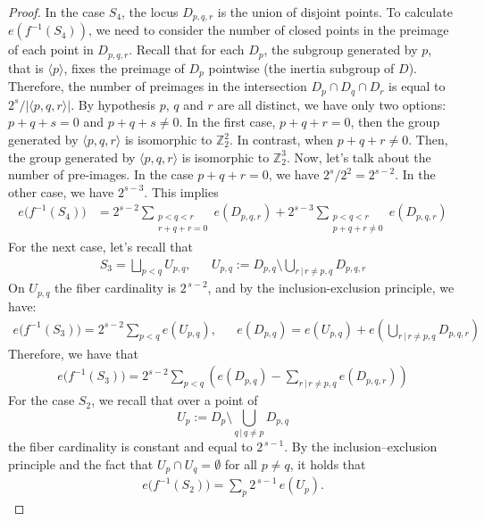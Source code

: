\documentclass[12pt,twoside,]{amsart}
\theoremstyle{plain}
\theoremstyle{definition}
\newcommand{\Z}{\mathbb Z}
\begin{document}
\begin{proof}
In the case $S_4$, the locus $D_{p,q,r}$ is the union of disjoint points.  To calculate $e(f^{-1}(S_4))$, we need to consider the number of closed points in the preimage of each point in $D_{p,q,r}$. Recall that for each $D_p$, the subgroup generated by $p$, that is $\langle p \rangle$, fixes the preimage of $D_p$ pointwise (the inertia subgroup of $D$). Therefore, the number of preimages 
in the intersection $D_p \cap D_q \cap D_r$ is equal to $2^{s}/|\langle p, q, r \rangle|$. 
By hypothesis $p$, $q$ and $r$ are all distinct, we have only two options: 
$p+q+s = 0$ and $p+q+s \neq 0$.
In the first case, $p+q+r = 0$, then the group generated by $\langle p,q,r \rangle$ is isomorphic to $\Z_2^2$. In contrast, when $p+q+r \neq 0$. Then, the group generated by $ \langle p,q,r \rangle$ is isomorphic to $\Z_2^3$. Now, let's talk about the number of pre-images. In the case $p+q+r =0$, we have $2^s/2^2 = 2^{s-2}$. In the other case, we have $2^{s-3}$. This implies 
\begin{align*}
e\big(f^{-1}(S_4)\big) 
&=
2^{s-2} 
\sum_{\substack{p<q<r \\ r+q+r  = 0}}
e(D_{p,q,r})
+
2^{s-3} 
\sum_{\substack{p < q <r \\ p+q+r \neq 0} }
e(D_{p,q,r})
\end{align*}
For the next case, let's recall that
\begin{align*}
S_3=
\bigsqcup_{p<q} U_{p,q}, 
&&
U_{p,q}:=
D_{p,q}\setminus \bigcup_{r\, | \, r\neq p,q} D_{p,q,r}
\end{align*}
On $U_{p,q}$ the fiber cardinality is $2^{\,s-2}$, 
and by the inclusion-exclusion principle, we have:
\begin{align*}
e\big(f^{-1}(S_3)\big) =
2^{s-2}\sum_{p<q}e(U_{p,q}),
&&
e(D_{p,q}) = 
e 
\left( U_{p,q}\right)
+
e \left(
\bigcup_{r\, | \, r\neq p,q} D_{p,q,r} 
\right)
\end{align*}
Therefore, we have that
\begin{align*}
e\big(f^{-1}(S_3)\big) 
 =
2^{s-2}\sum_{p<q} \left(
e(D_{p,q}) - \sum_{r \, | \, r \neq p,q}
e(D_{p,q,r})
\right)
\end{align*}
For the case $S_2$, we recall that over a point of 
\[
U_p := D_p \setminus \bigcup_{q \, | \, q \neq p} D_{p,q}
\]
the fiber cardinality is constant and equal to $2^{\,s-1}$. By the inclusion–exclusion principle and the fact that \(U_p \cap U_q = \emptyset\) for all \(p \neq q\), it holds that
\begin{align*}
e\bigl(f^{-1}(S_2)\bigr) =\sum_{p} 2^{\,s-1}\, e(U_p).

\end{align*}
\end{proof}
\end{document}

